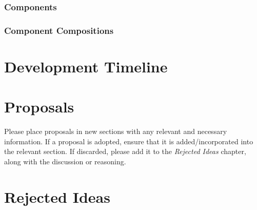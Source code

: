 \documentclass[letterpaper, twoside, 12pt]{memoir}
\begin{document}
\subsection{Components}
\subsection{Component Compositions}

\chapter{Development Timeline}

\chapter{Proposals}

Please place proposals in new sections with any relevant and necessary information. If a proposal is adopted, ensure that it is added/incorporated into the relevant section. If discarded, please add it to the \textit{Rejected Ideas} chapter, along with the discussion or reasoning.

\chapter{Rejected Ideas}
\end{document}
